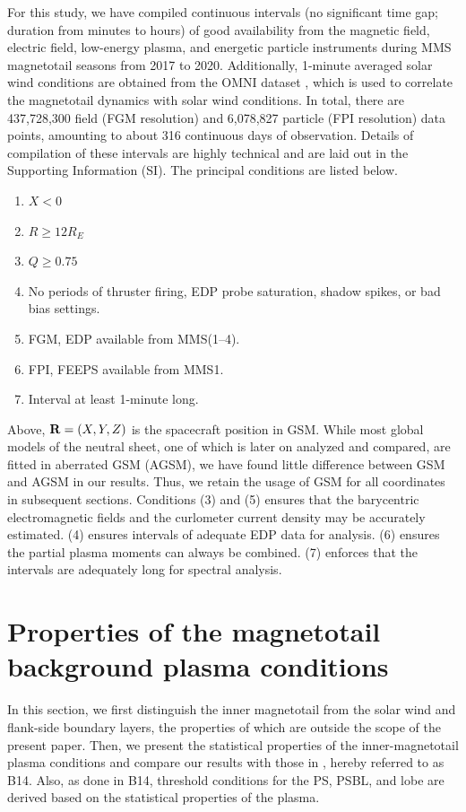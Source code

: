 \documentclass[draft]{agujournal2019}
\begin{document}
For this study, we have compiled continuous intervals (no significant time gap; duration from minutes to hours) of good availability from the magnetic field, electric field, low-energy plasma, and energetic particle instruments during MMS magnetotail seasons from 2017 to 2020. Additionally, 1-minute averaged solar wind conditions are obtained from the OMNI dataset \cite{King2005}, which is used to correlate the magnetotail dynamics with solar wind conditions. In total, there are 437,728,300 field (FGM resolution) and 6,078,827 particle (FPI resolution) data points, amounting to about 316 continuous days of observation. Details of compilation of these intervals are highly technical and are laid out in the Supporting Information (SI). The principal conditions are listed below.
\begin{enumerate}
    \item ${X<0}$
    \item ${R\geq 12R_E}$
    \item ${Q\geq0.75}$
    \item No periods of thruster firing, EDP probe saturation, shadow spikes, or bad bias settings.
    \item FGM, EDP available from MMS(1--4).
    \item FPI, FEEPS available from MMS1.
    \item Interval at least 1-minute long.
\end{enumerate}
Above, ${\vb{R}=(X,Y,Z)}$ is the spacecraft position in GSM. While most global models of the neutral sheet, one of which is later on analyzed and compared, are fitted in aberrated GSM (AGSM), we have found little difference between GSM and AGSM in our results. Thus, we retain the usage of GSM for all coordinates in subsequent sections. Conditions (3) and (5) ensures that the barycentric electromagnetic fields and the curlometer current density may be accurately estimated. (4) ensures intervals of adequate EDP data for analysis. (6) ensures the partial plasma moments can always be combined. (7) enforces that the intervals are adequately long for spectral analysis.

\section{Properties of the magnetotail background plasma conditions}\label{sec:background_parameters}

In this section, we first distinguish the inner magnetotail from the solar wind and flank-side boundary layers, the properties of which are outside the scope of the present paper. Then, we present the statistical properties of the inner-magnetotail plasma conditions and compare our results with those in , hereby referred to as B14. Also, as done in B14, threshold conditions for the PS, PSBL, and lobe are derived based on the statistical properties of the plasma.
\end{document}
